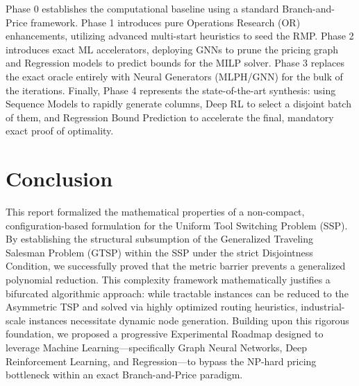 \documentclass[12pt]{article}
\begin{document}
	Phase 0 establishes the computational baseline using a standard Branch-and-Price framework. Phase 1 introduces pure Operations Research (OR) enhancements, utilizing advanced multi-start heuristics to seed the RMP. Phase 2 introduces exact ML accelerators, deploying GNNs to prune the pricing graph and Regression models to predict bounds for the MILP solver. Phase 3 replaces the exact oracle entirely with Neural Generators (MLPH/GNN) for the bulk of the iterations. Finally, Phase 4 represents the state-of-the-art synthesis: using Sequence Models to rapidly generate columns, Deep RL to select a disjoint batch of them, and Regression Bound Prediction to accelerate the final, mandatory exact proof of optimality.
	
	\section{Conclusion}
	
	This report formalized the mathematical properties of a non-compact, configuration-based formulation for the Uniform Tool Switching Problem (SSP). By establishing the structural subsumption of the Generalized Traveling Salesman Problem (GTSP) within the SSP under the strict Disjointness Condition, we successfully proved that the metric barrier prevents a generalized polynomial reduction. This complexity framework mathematically justifies a bifurcated algorithmic approach: while tractable instances can be reduced to the Asymmetric TSP and solved via highly optimized routing heuristics, industrial-scale instances necessitate dynamic node generation. Building upon this rigorous foundation, we proposed a progressive Experimental Roadmap designed to leverage Machine Learning—specifically Graph Neural Networks, Deep Reinforcement Learning, and Regression—to bypass the NP-hard pricing bottleneck within an exact Branch-and-Price paradigm.
	
	
	
	
\end{document}
